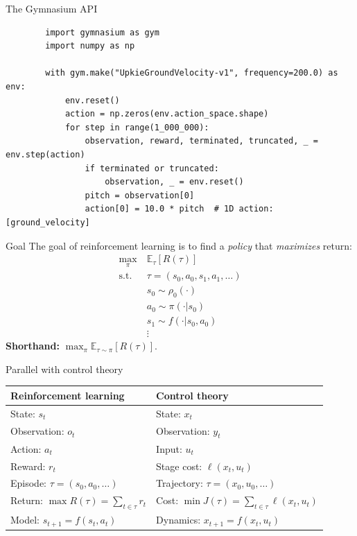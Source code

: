 \documentclass[11pt, aspectratio=169]{beamer}
\begin{document}
\begin{frame}[fragile]{The Gymnasium API}
    \begin{verbatim}
        import gymnasium as gym
        import numpy as np

        with gym.make("UpkieGroundVelocity-v1", frequency=200.0) as env:
            env.reset() 
            action = np.zeros(env.action_space.shape)
            for step in range(1_000_000):
                observation, reward, terminated, truncated, _ = env.step(action)
                if terminated or truncated:
                    observation, _ = env.reset()
                pitch = observation[0]
                action[0] = 10.0 * pitch  # 1D action: [ground_velocity]
    \end{verbatim}
\end{frame}

\begin{frame}{Goal}
    The goal of reinforcement learning is to find a \emph{policy} that \emph{maximizes} return:
    \begin{align*}
        \max_{\pi} \ & \mathbb{E}_{\tau} [R(\tau)] \\
        \mathrm{s.t.} \ & \tau = (s_0, a_0, s_1, a_1, \ldots) \\
        & s_0 \sim \rho_0(\cdot) \\
        & a_0 \sim \pi(\cdot | s_0) \\
        & s_1 \sim f(\cdot | s_0, a_0) \\
        & \vdots
    \end{align*}
    \textbf{Shorthand:} $\max_\pi \mathbb{E}_{\tau \sim \pi}[R(\tau)]$.
\end{frame}

\begin{frame}{Parallel with control theory}
    \begin{table}
        \begin{tabular}{ll}
            \textbf{Reinforcement learning} & \textbf{Control theory} \\
            \hline
            State: $s_t$ & State: $x_t$ \\
            Observation: $o_t$ & Observation: $y_t$ \\
            Action: $a_t$ & Input: $u_t$ \\
            Reward: $r_t$ & Stage cost: $\ell(x_t, u_t)$ \\
            Episode: $\tau = (s_0, a_0, \ldots)$ & Trajectory: $\tau = (x_0, u_0, \ldots)$ \\
            Return: $\max R(\tau) = \sum_{t \in \tau} r_t$ & Cost: $\min J(\tau) = \sum_{t \in \tau} \ell(x_t, u_t)$ \\
            Model: $s_{t+1} = f(s_t, a_t)$ & Dynamics: $x_{t+1} = f(x_t, u_t)$ \\
        \end{tabular}
    \end{table}
\end{frame}
\end{document}
